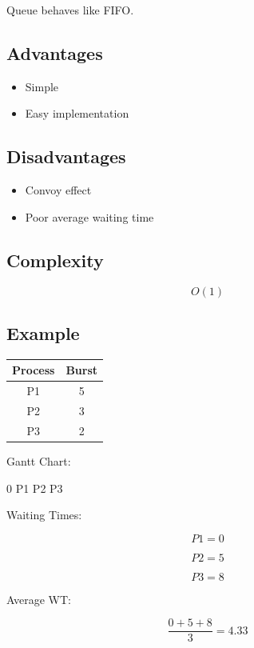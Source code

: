 Queue behaves like FIFO.

\subsection{Advantages}

\begin{itemize}
\item Simple
\item Easy implementation
\end{itemize}

\subsection{Disadvantages}

\begin{itemize}
\item Convoy effect
\item Poor average waiting time
\end{itemize}

\subsection{Complexity}

\[
O(1)
\]

\subsection{Example}

\begin{table}[H]
\centering
\begin{tabular}{|c|c|}
\hline
Process & Burst \\
\hline
P1 & 5\\
P2 & 3\\
P3 & 2\\
\hline
\end{tabular}
\end{table}

Gantt Chart:

\begin{center}
0 \quad P1  \quad P2  \quad P3 
\end{center}

Waiting Times:

\[
P1=0
\]

\[
P2=5
\]

\[
P3=8
\]

Average WT:

\[
\frac{0+5+8}{3}=4.33
\]

